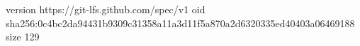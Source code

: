 version https://git-lfs.github.com/spec/v1
oid sha256:0c4bc2da94431b9309c31358a11a3d11f5a870a2d6320335ed40403a06469188
size 129
